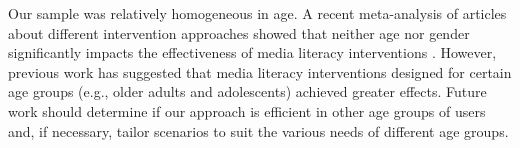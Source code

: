 
 
Our sample was relatively homogeneous in age. A recent meta-analysis of articles about different intervention approaches showed that neither age nor gender significantly impacts the effectiveness of media literacy interventions \cite{lu2024can}. However, previous work has suggested that media literacy interventions designed for certain age groups (e.g., older adults and adolescents) achieved greater effects\cite{moore2022digital,hartwig2024adolescents}. Future work should determine if our approach is efficient in other age groups of users and, if necessary, tailor scenarios to suit the various needs of different age groups.

